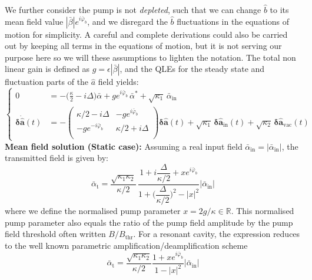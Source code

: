 We further consider the pump is not \textit{depleted}, such that we can change $\hat{b}$ to its mean field value $|\bar{\beta}|e^{i\bar{\varphi}_b}$, and we disregard the $\hat{b}$ fluctuations in the equations of motion for simplicity. A careful and complete derivations could also be carried out by keeping all terms in the equations of motion, but it is not serving our purpose here so we will these assumptions to lighten the notation. The total non linear gain is defined as $g = \epsilon |\bar\beta|$, and the QLEs for the steady state and fluctuation parts of the $\hat{a}$ field yields: 
 \begin{equation}
  \left\{
  \begin{split}
  0 &= -\Big(\frac{\kappa}{2}-i\Delta\Big) \bar{\alpha} +g e^{i\bar{\varphi}_b} \, \bar{\alpha}^* + \sqrt{\kappa_1} \, \bar{\alpha}_{\mathrm{in}} \\
  \mathbf{\delta \dot{\hat{a}}}(t)&= - \begin{pmatrix}
  \kappa/2-i\Delta & -g e^{i\bar{\varphi}_b}\\
   -g e^{-i\bar{\varphi}_b} & \kappa/2+i\Delta \\
  \end{pmatrix}  \mathbf{\delta \hat{a}}(t) + \sqrt{\kappa_{\mathrm{1}}} \, \mathbf{\delta \hat{a}_{\mathrm{in}}}(t)  + \sqrt{\kappa_2} \, \mathbf{\delta \hat{a}_{\mathrm{vac}}}(t)
  \end{split}
  \right.
\end{equation}
\noindent \textbf{Mean field solution (Static case): }Assuming a real input field $\bar{\alpha}_\textrm{in}=|\bar{\alpha}_\textrm{in}|$, the transmitted field is given by: 
\begin{equation}
   \bar{\alpha}_{\mathrm{t}} = \frac{\sqrt{\kappa_1\kappa_2}}{\kappa/2} \, \frac{1+i\dfrac{\Delta}{\kappa/2}+xe^{i\bar{\varphi}_b}}{1+\Big(\dfrac{\Delta}{\kappa/2}\Big)^2 - |x|^2}  |\bar{\alpha}_\textrm{in}|
\end{equation}
where we define the normalised pump parameter $x = 2g / \kappa \in\mathbb{R}$. This normalised pump parameter also equals the ratio of the pump field amplitude by the pump field threshold often written $B/B_{\mathrm{thr}}$. For a resonant cavity, the expression reduces to the well known parametric amplification/deamplification scheme 
\begin{equation}
   \bar{\alpha}_{\mathrm{t}} =  \frac{\sqrt{\kappa_1\kappa_2}}{\kappa/2}\frac{1+x e^{i\bar{\varphi}_b}}{1 - |x|^2} | \bar{\alpha}_\textrm{in} |
\end{equation}
